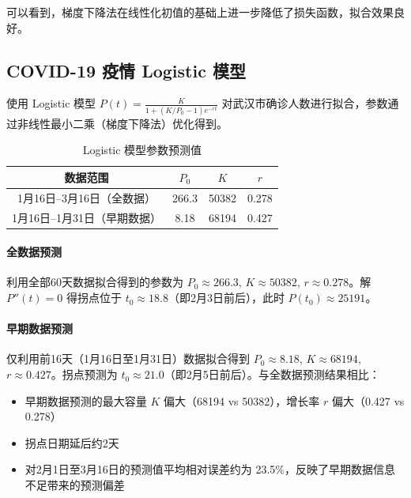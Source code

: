 \documentclass{article}
\begin{document}
可以看到，梯度下降法在线性化初值的基础上进一步降低了损失函数，拟合效果良好。

\subsection{COVID-19 疫情 Logistic 模型}

使用 Logistic 模型 $P(t) = \frac{K}{1 + (K/P_0 - 1)e^{-rt}}$ 对武汉市确诊人数进行拟合，参数通过非线性最小二乘（梯度下降法）优化得到。

\begin{table}[h]
\centering
\begin{tabular}{cccc}
\toprule
数据范围 & $P_0$ & $K$ & $r$ \\
\midrule
1月16日--3月16日（全数据） & 266.3 & 50382 & 0.278 \\
1月16日--1月31日（早期数据） & 8.18 & 68194 & 0.427 \\
\bottomrule
\end{tabular}
\caption{Logistic 模型参数预测值}
\end{table}

\paragraph{全数据预测} 利用全部60天数据拟合得到的参数为 $P_0 \approx 266.3$, $K \approx 50382$, $r \approx 0.278$。解 $P''(t) = 0$ 得拐点位于 $t_0 \approx 18.8$（即2月3日前后），此时 $P(t_0) \approx 25191$。

\paragraph{早期数据预测} 仅利用前16天（1月16日至1月31日）数据拟合得到 $P_0 \approx 8.18$, $K \approx 68194$, $r \approx 0.427$。拐点预测为 $t_0 \approx 21.0$（即2月5日前后）。与全数据预测结果相比：
\begin{itemize}
    \item 早期数据预测的最大容量 $K$ 偏大（68194 vs 50382），增长率 $r$ 偏大（0.427 vs 0.278）
    \item 拐点日期延后约2天
    \item 对2月1日至3月16日的预测值平均相对误差约为 23.5\%，反映了早期数据信息不足带来的预测偏差
\end{itemize}
\end{document}
